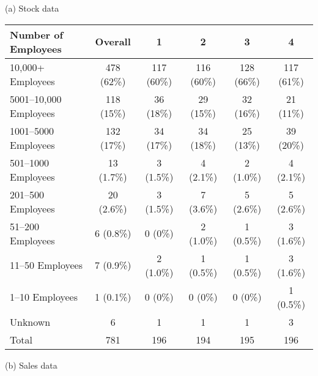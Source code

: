 \documentclass[12pt]{article}
\begin{document}



\begin{table}
    \centering
    \label{tab:firm_size}
    
    (a) Stock data
    \vspace{0.5cm}

    \begin{tabular}{lccccc}
        \toprule
        Number of Employees & Overall & 1 & 2 & 3 & 4 \\
        \midrule
        10,000+ Employees & 478 (62\%) & 117 (60\%) & 116 (60\%) & 128 (66\%) & 117 (61\%)\\
        5001--10,000 Employees & 118 (15\%) & 36 (18\%) & 29 (15\%) & 32 (16\%) & 21 (11\%)\\
        1001--5000 Employees & 132 (17\%) & 34 (17\%) & 34 (18\%) & 25 (13\%) & 39 (20\%)\\
        501--1000 Employees & 13 (1.7\%) & 3 (1.5\%) & 4 (2.1\%) & 2 (1.0\%) & 4 (2.1\%)\\
        201--500 Employees & 20 (2.6\%) & 3 (1.5\%) & 7 (3.6\%) & 5 (2.6\%) & 5 (2.6\%)\\
        51--200 Employees & 6 (0.8\%) & 0 (0\%) & 2 (1.0\%) & 1 (0.5\%) & 3 (1.6\%)\\
        11--50 Employees & 7 (0.9\%) & 2 (1.0\%) & 1 (0.5\%) & 1 (0.5\%) & 3 (1.6\%)\\
        1--10 Employees & 1 (0.1\%) & 0 (0\%) & 0 (0\%) & 0 (0\%) & 1 (0.5\%)\\
        Unknown & 6 & 1 & 1 & 1 & 3\\
        \midrule
        Total &  781 & 196 & 194 & 195 & 196 \\
        \bottomrule
    \end{tabular}
    
    \vspace{1cm}
    (b) Sales data
    \vspace{0.5cm}


\end{table}
\end{document}
